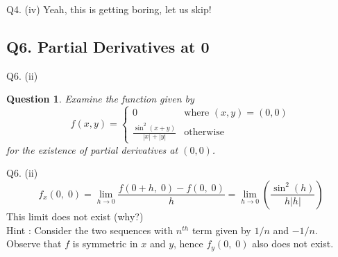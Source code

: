 \documentclass[aspectratio=169]{beamer}
\newtheorem{qsn}{Question}
\begin{document}
\begin{frame}{Q4. (iv)}
 {
    Yeah, this is getting boring, let us skip!
}
\end{frame}

\subsection{Q6. Partial Derivatives at 0}
\begin{frame}{Q6. (ii)}
    \begin{qsn}
        Examine the function given by
         $$f(x,y) = 
         \begin{cases}
         0 & \text{where } (x,y)=(0,0)\\
         \frac{\sin^2(x+y)}{|x|+|y|} & \text{otherwise}
         \end{cases}$$
        for the existence of partial derivatives at $(0, 0)$.
    \end{qsn}
\end{frame}

\begin{frame}{Q6. (ii)}
     {
	    $$f_x(0,\;0) = \displaystyle\lim_{h\to 0}\frac{f(0+h,\;0) - f(0,\;0)}{h} = \displaystyle\lim_{h\to 0}\left(\frac{\sin^2(h)}{h|h|}\right)$$
	}
     {
    This limit does not exist (why?)\\[1mm]
	}
	\uncover<4-> {
	Hint : Consider the two sequences with $n^{th}$ term given by $1/n$ and $-1/n$.\\[1mm] 
	}
     {
    Observe that $f$ is symmetric in $x$ and $y$, hence $f_y(0,\;0)$ also does not exist.
    }
\end{frame}
\end{document}
